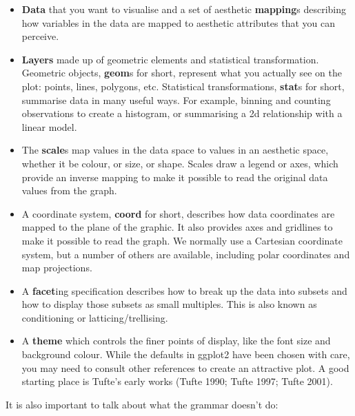 \begin{itemize}
\item
  \textbf{Data} that you want to visualise and a set of aesthetic
  \textbf{mapping}s describing how variables in the data are mapped to
  aesthetic attributes that you can perceive.
\item
  \textbf{Layers} made up of geometric elements and statistical
  transformation. Geometric objects, \textbf{geom}s for short, represent
  what you actually see on the plot: points, lines, polygons, etc.
  Statistical transformations, \textbf{stat}s for short, summarise data
  in many useful ways. For example, binning and counting observations to
  create a histogram, or summarising a 2d relationship with a linear
  model.
\item
  The \textbf{scale}s map values in the data space to values in an
  aesthetic space, whether it be colour, or size, or shape. Scales draw
  a legend or axes, which provide an inverse mapping to make it possible
  to read the original data values from the graph.
\item
  A coordinate system, \textbf{coord} for short, describes how data
  coordinates are mapped to the plane of the graphic. It also provides
  axes and gridlines to make it possible to read the graph. We normally
  use a Cartesian coordinate system, but a number of others are
  available, including polar coordinates and map projections.
\item
  A \textbf{facet}ing specification describes how to break up the data
  into subsets and how to display those subsets as small multiples. This
  is also known as conditioning or latticing/trellising.
\item
  A \textbf{theme} which controls the finer points of display, like the
  font size and background colour. While the defaults in ggplot2 have
  been chosen with care, you may need to consult other references to
  create an attractive plot. A good starting place is Tufte's early
  works (Tufte 1990; Tufte 1997; Tufte 2001).
\end{itemize}

It is also important to talk about what the grammar doesn't do:


